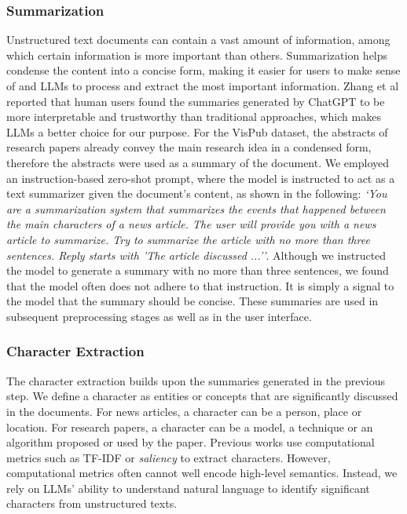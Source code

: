 \subsubsection{Summarization}\label{sec: summarization}
Unstructured text documents can contain a vast amount of information, among which certain information is more important than others.
Summarization helps condense the content into a concise form, making it easier for users to make sense of and LLMs to process and extract the most important information. 
Zhang et al\cite{zhang2023extractive} reported that human users found the summaries generated by ChatGPT to be more interpretable and trustworthy than traditional approaches, which makes LLMs a better choice for our purpose.
For the VisPub dataset, the abstracts of research papers already convey the main research idea in a condensed form, therefore the abstracts were used as a summary of the document.
We employed an instruction-based zero-shot prompt, where the model is instructed to act as a text summarizer given the document's content, as shown in the following: 
\textit{`You are a summarization system that summarizes the events that happened between the main characters of a news article.
The user will provide you with a news article to summarize.
Try to summarize the article with no more than three sentences. 
Reply starts with 'The article discussed ...''}.
Although we instructed the model to generate a summary with no more than three sentences, we found that the model often does not adhere to that instruction.
It is simply a signal to the model that the summary should be concise.
These summaries are used in subsequent preprocessing stages as well as in the user interface.

\subsubsection{Character Extraction}\label{sec: character_extraction}
The character extraction builds upon the summaries generated in the previous step.
We define a character as entities or concepts that are significantly discussed in the documents.
For news articles, a character can be a person, place or location.
For research papers, a character can be a model, a technique or an algorithm proposed or used by the paper.
Previous works use computational metrics such as TF-IDF or \textit{saliency} to extract characters.
However, computational metrics often cannot well encode high-level semantics.
Instead, we rely on LLMs' ability to understand natural language to identify significant characters from unstructured texts.

